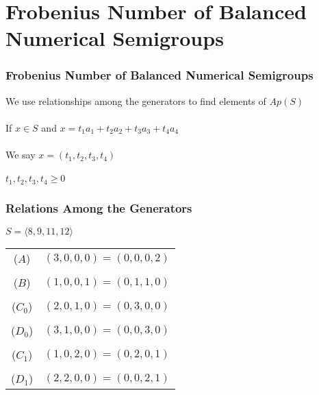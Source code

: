 \documentclass{beamer}
\begin{document}
\section{Frobenius Number of Balanced Numerical Semigroups}

\begin{frame}
\begin{center}
\frametitle{Frobenius Number of Balanced Numerical Semigroups}

We use relationships among the generators to find elements of $Ap(S)$\\

~\\

If $x \in S$ and $x = t_1 a_1 + t_2 a_2 + t_3 a_3 + t_4 a_4$\\

~\\

We say $x = \left(t_1, t_2, t_3, t_4\right)$\\

~\\

$t_1, t_2, t_3, t_4 \ge 0$

\end{center}
\end{frame}


\begin{frame}
\begin{center}
\frametitle{Relations Among the Generators}

$S = \langle 8, 9, 11, 12 \rangle$

{\footnotesize
\begin{center}
\begin{tabular}{cl}
($A$) & $\left(3, 0, 0, 0\right) = \left(0, 0, 0, 2\right)$\\
 &\\
($B$) & $\left(1, 0, 0, 1\right) = \left(0, 1, 1, 0\right)$\\
 &\\
($C_0$) & $\left(2, 0, 1, 0\right) = \left(0, 3, 0, 0\right)$\\
 &\\
($D_0$) & $\left(3, 1, 0, 0\right) = \left(0, 0, 3, 0\right)$\\
 &\\
($C_1$) & $\left(1, 0, 2, 0\right) = \left(0, 2, 0, 1\right)$\\
 &\\
($D_1$) & $\left(2, 2, 0, 0\right) = \left(0, 0, 2, 1\right)$\\
\end{tabular}
\end{center}
}

\end{center}
\end{frame}
\end{document}
